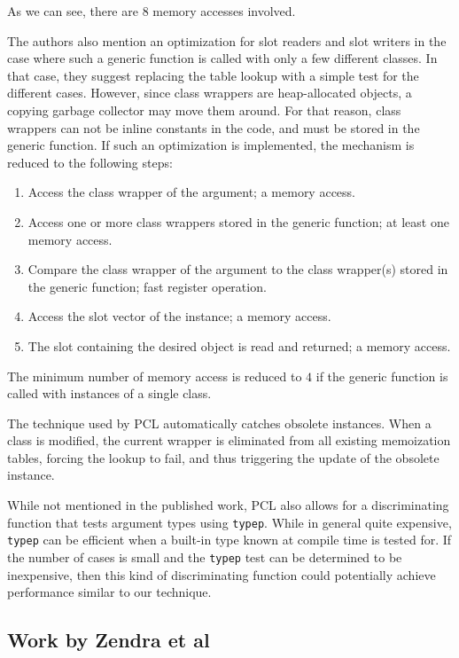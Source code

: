 As we can see, there are $8$ memory accesses involved. 

The authors also mention an optimization for slot readers and slot
writers in the case where such a generic function is called with only
a few different classes.  In that case, they suggest replacing the
table lookup with a simple test for the different cases.  However,
since class wrappers are heap-allocated objects, a copying garbage
collector may move them around.  For that reason, class wrappers can
not be inline constants in the code, and must be stored in the generic
function.  If such an optimization is implemented, the mechanism is
reduced to the following steps:

\begin{enumerate}
\item Access the class wrapper of the argument; a memory access.
\item Access one or more class wrappers stored in the generic
  function; at least one memory access.
\item Compare the class wrapper of the argument to the class
  wrapper(s) stored in the generic function; fast register operation.
\item Access the slot vector of the instance; a memory access.
\item The slot containing the desired object is read and returned; a
  memory access.
\end{enumerate}

The minimum number of memory access is reduced to $4$ if the generic
function is called with instances of a single class.  

The technique used by PCL automatically catches obsolete instances.
When a class is modified, the current wrapper is eliminated from all
existing memoization tables, forcing the lookup to fail, and thus
triggering the update of the obsolete instance.  

While not mentioned in the published work, PCL also allows for a
discriminating function that tests argument types using
\texttt{typep}.  While in general quite expensive, \texttt{typep} can
be efficient when a built-in type known at compile time is tested for.
If the number of cases is small and the \texttt{typep} test can be
determined to be inexpensive, then this kind of discriminating
function could potentially achieve performance similar to our
technique. 

\subsection{Work by Zendra et al}

